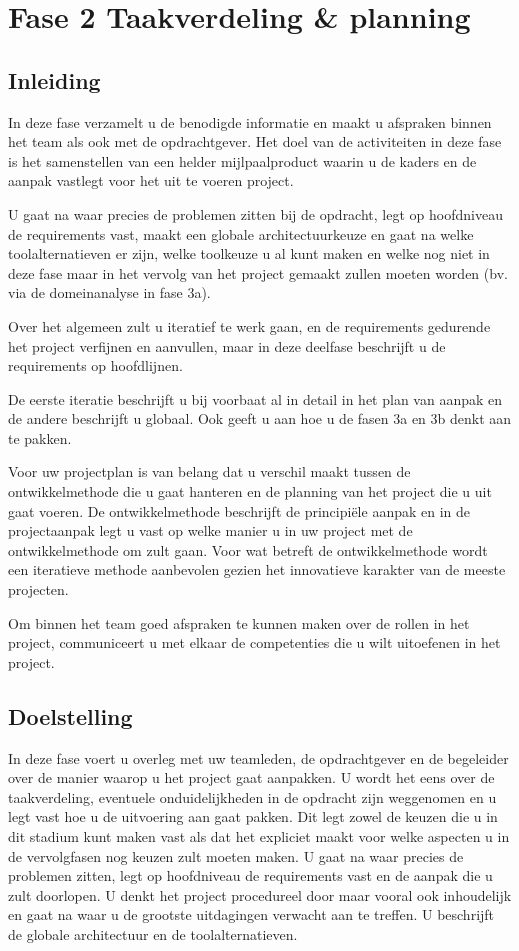 \section{Fase 2 Taakverdeling \& planning}
\subsection{Inleiding}
In deze fase verzamelt u de benodigde informatie en maakt u afspraken
binnen het team als ook met de opdrachtgever. Het doel van de activiteiten
in deze fase  is het samenstellen van een helder mijlpaalproduct waarin u
de kaders en de aanpak vastlegt voor het uit te voeren project.

U gaat na waar precies de problemen zitten bij de opdracht, legt op
hoofdniveau de requirements vast, maakt een globale architectuurkeuze
en gaat na welke toolalternatieven er zijn, welke toolkeuze u al kunt
maken en welke nog niet in deze fase maar in het vervolg van het project
gemaakt zullen moeten worden (bv. via de domeinanalyse in fase 3a).

Over het algemeen zult u iteratief te werk gaan, en de requirements
gedurende het project verfijnen en aanvullen, maar in deze deelfase
beschrijft u de requirements op hoofdlijnen.

De eerste iteratie beschrijft u bij voorbaat al in detail in het
plan van aanpak en de andere beschrijft u globaal. Ook
geeft u aan hoe u de fasen 3a en 3b denkt aan te pakken.

Voor uw projectplan is van belang dat u verschil maakt tussen de
ontwikkelmethode die u gaat hanteren en de planning van het project
die u uit gaat voeren. De ontwikkelmethode beschrijft de principi\"ele
aanpak en in de projectaanpak legt u vast op welke manier u in uw
project met de ontwikkelmethode om  zult gaan. Voor wat betreft
de ontwikkelmethode wordt een iteratieve methode aanbevolen gezien
het innovatieve karakter van de meeste projecten.

Om binnen het team goed afspraken te kunnen maken over de rollen
in het project, communiceert u met elkaar de competenties die u
wilt uitoefenen in het project.

\subsection{Doelstelling}
    In deze fase voert u overleg met uw teamleden, de opdrachtgever en de
begeleider over de manier waarop u het project gaat aanpakken. U wordt het eens
over de taakverdeling, eventuele onduidelijkheden in de opdracht zijn weggenomen
en u legt vast hoe u de uitvoering aan gaat pakken. Dit legt zowel de keuzen
die u in dit stadium kunt maken vast als dat het expliciet maakt voor welke
aspecten u in de vervolgfasen nog keuzen zult moeten maken.
    U gaat na waar precies de problemen zitten, legt op hoofdniveau de
requirements vast en de aanpak die u zult doorlopen. U denkt het project
procedureel door maar vooral ook inhoudelijk en gaat na waar u de grootste
uitdagingen verwacht aan te treffen. U beschrijft de globale architectuur en de
toolalternatieven.

